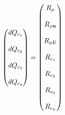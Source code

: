 \documentclass[a4paper]{article}
\begin{document}
\begin{landscape}
\begin{huge}
\begin{equation}
\begin{pmatrix}
      dQ_{c_1} \\ \\
      dQ_{c_2} \\ \\
      dQ_{c_3} \\ \\
      dQ_{c_4}
    \end{pmatrix}
    =
    \begin{pmatrix}
      R_{\rho} \\ \\
      R_{\rho \mathbf u} \\ \\
      R_{\rho E} \\ \\
      R_{c_1} \\ \\
      R_{c_2} \\ \\
      R_{c_3} \\ \\
      R_{c_4}
    \end{pmatrix}
    \label{full-adjoint}
  \end{equation}


\end{huge}
\end{landscape}
\end{document}
